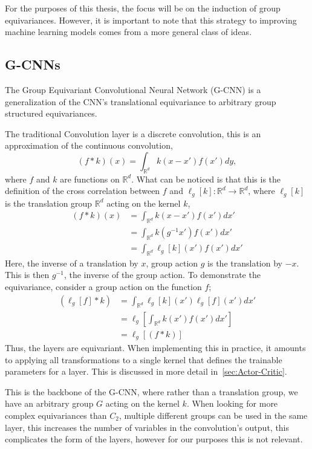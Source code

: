 For the purposes of this thesis, the focus will be on the induction of group equivariances. However, it is important to note that this strategy to improving machine learning models comes from a more general class of ideas.


\subsection{G-CNNs}\label{sec:G-CNNs}

The Group Equivariant Convolutional Neural Network (G-CNN) is a generalization of the CNN's translational equivariance to arbitrary group structured equivariances.

The traditional Convolution layer is a discrete convolution, this is an approximation of the continuous convolution,
\begin{equation}
	(f*k)(x) = \int_{\mathbb{R}^d} k(x-x')f(x')dy,
\end{equation}
where $f$ and $k$ are functions on $\mathbb{R}^d$. What can be noticed is that this is the definition of the cross correlation between $f$ and $\ell_g[k]:  \mathbb{R}^d  \rightarrow \mathbb{R}^d$, where $\ell_g[k]$
is the translation group $\mathbb{R}^d$ acting on the kernel $k$,
\begin{align}
	(f*k)(x) & = \int_{\mathbb{R}^d} k(x-x')f(x')dx'       \\
	         & = \int_{\mathbb{R}^d} k(g^{-1}x')f(x')dx'   \\
	         & = \int_{\mathbb{R}^d} \ell_g[k](x')f(x')dx'
\end{align}
Here, the inverse of a translation by $x$, group action $g$ is the translation by $-x$. This is then $g^{-1}$, the inverse of the group action. To demonstrate the equivariance, consider a group action on the function $f$;
\begin{align}
	(\ell_g[f]* k) & = \int_{\mathbb{R}^d} \ell_g[k](x')\ell_g[f](x')dx' \\
	               & = \ell_g[\int_{\mathbb{R}^d} k(x')f(x')dx']         \\
	               & = \ell_g[(f * k)]
\end{align}
Thus, the layers are equivariant. When implementing this in practice, it amounts to applying all transformations to a single kernel that defines the trainable parameters for a layer. This is discussed in more detail in~\ref{sec:Actor-Critic}.

This is the backbone of the G-CNN\cite{cohen2016group}, where rather than a translation group, we have an arbitrary group $G$ acting on the kernel $k$. When looking for more complex equivariances than $C_2$, multiple different groups can be used in the same layer, this increases the number of variables in the convolution's output, this complicates the form of the layers, however for our purposes this is not relevant.



